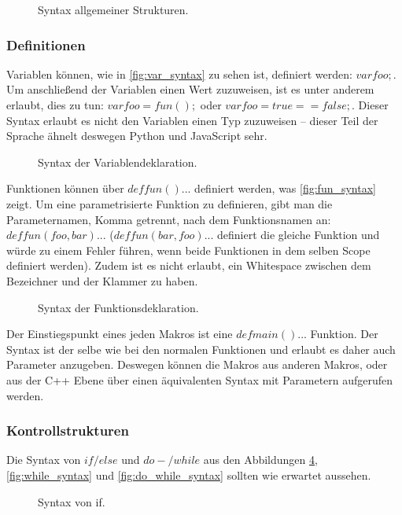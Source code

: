       \begin{figure}[H]
        \centering
        \caption{Syntax allgemeiner Strukturen.}
        \label{fig:common_syntax}
      \end{figure}

    \subsubsection{Definitionen}
    \label{sssec:Definitionen}
      Variablen können, wie in \autoref{fig:var_syntax} zu sehen ist, definiert werden: \myMIn$var foo;$. Um anschließend der Variablen einen Wert zuzuweisen, ist es unter anderem erlaubt, dies zu tun: \myMIn$var foo = fun();$ oder \myMIn$var foo = true == false;$. Dieser Syntax erlaubt es nicht den Variablen einen Typ zuzuweisen -- dieser Teil der Sprache ähnelt deswegen Python und JavaScript sehr.
      \begin{figure}[H]
        \centering
        \caption{Syntax der Variablendeklaration.}
        \label{fig:var_syntax}
      \end{figure}

      Funktionen können über \myMIn$def fun(){...}$ definiert werden, was \autoref{fig:fun_syntax} zeigt. Um eine parametrisierte Funktion zu definieren, gibt man die Parameternamen, Komma getrennt, nach dem Funktionsnamen an: \myMIn$def fun(foo, bar){...}$ (\myMIn$def fun(bar, foo){...}$ definiert die gleiche Funktion und würde zu einem Fehler führen, wenn beide Funktionen in dem selben Scope definiert werden). Zudem ist es nicht erlaubt, ein Whitespace zwischen dem Bezeichner und der Klammer zu haben.
      \begin{figure}[H]
        \centering
        \caption{Syntax der Funktionsdeklaration.}
        \label{fig:fun_syntax}
      \end{figure}
      Der Einstiegspunkt eines jeden Makros ist eine \myMIn$def main(){...}$ Funktion. Der Syntax ist der selbe wie bei den normalen Funktionen und erlaubt es daher auch Parameter anzugeben. Deswegen können die Makros aus anderen Makros, oder aus der C++ Ebene über einen äquivalenten Syntax mit Parametern aufgerufen werden.

    \subsubsection{Kontrollstrukturen}
    \label{sssec:Kontrollstrukturen}
      Die Syntax von \myMIn$if/else$ und \myMIn$do-/while$ aus den Abbildungen \ref{fig:if_syntax}, \ref{fig:while_syntax} und \ref{fig:do_while_syntax} sollten wie erwartet aussehen.
      \begin{figure}[H]
        \centering
        \caption{Syntax von if.}
        \label{fig:if_syntax}
      \end{figure}


